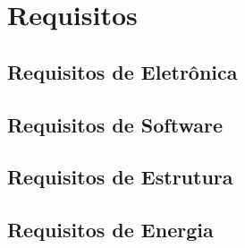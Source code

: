\chapter[Requisitos]{Requisitos}
	\section[Requisitos de Eletrônica]{Requisitos de Eletrônica}

	\section[Requisitos de Software]{Requisitos de Software}

	\section[Requisitos de Estrutura]{Requisitos de Estrutura}

	\section[Requisitos de Energia]{Requisitos de Energia}

